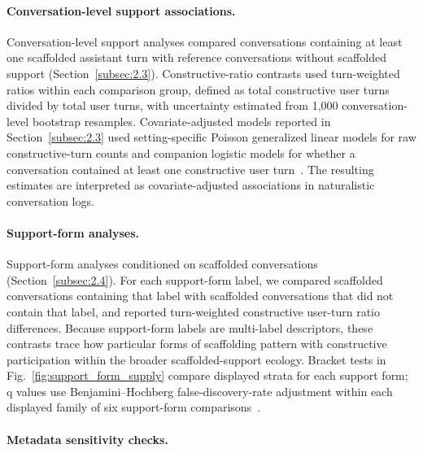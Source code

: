 \paragraph{Conversation-level support associations.}
Conversation-level support analyses compared conversations containing at least one scaffolded assistant turn with reference conversations without scaffolded support (Section~\ref{subsec:2.3}).
Constructive-ratio contrasts used turn-weighted ratios within each comparison group, defined as total constructive user turns divided by total user turns, with uncertainty estimated from 1,000 conversation-level bootstrap resamples. Covariate-adjusted models reported in Section~\ref{subsec:2.3} used setting-specific Poisson generalized linear models for raw constructive-turn counts and companion logistic models for whether a conversation contained at least one constructive user turn~\cite{mccullagh1989generalized,agresti2013categorical}.
The resulting estimates are interpreted as covariate-adjusted associations in naturalistic conversation logs.

\paragraph{Support-form analyses.}
Support-form analyses conditioned on scaffolded conversations (Section~\ref{subsec:2.4}).
For each support-form label, we compared scaffolded conversations containing that label with scaffolded conversations that did not contain that label, and reported turn-weighted constructive user-turn ratio differences. Because support-form labels are multi-label descriptors, these contrasts trace how particular forms of scaffolding pattern with constructive participation within the broader scaffolded-support ecology. Bracket tests in Fig.~\ref{fig:support_form_supply} compare displayed strata for each support form; q values use Benjamini--Hochberg false-discovery-rate adjustment within each displayed family of six support-form comparisons~\cite{benjamini1995controlling}.

\paragraph{Metadata sensitivity checks.}

